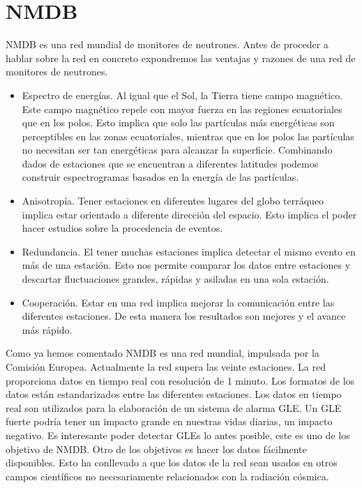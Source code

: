 \section{NMDB}
	NMDB\cite{NMDB2011} es una red mundial de monitores de neutrones. Antes de proceder a hablar sobre la red en concreto expondremos las ventajas
	y razones de una red de monitores de neutrones.
	\begin{itemize}
		\item 	Espectro de energías. Al igual que el Sol, la Tierra tiene campo magnético. Este campo magnético repele con mayor fuerza en
		  	las regiones ecuatoriales que en los polos. Esto implica que solo las partículas más energéticas son perceptibles en las
			zonas ecuatoriales, mientras que en los polos las partículas no necesitan ser tan energéticas para alcanzar la superficie.
			Combinando dados de estaciones que se encuentran a diferentes latitudes podemos construir espectrogramas basados en la energía
			de las partículas.
		\item 	Anisotropía. Tener estaciones en diferentes lugares del globo terráqueo implica estar orientado a diferente dirección del
		  	espacio. Esto implica el poder hacer estudios sobre la procedencia de eventos.
		\item 	Redundancia. El tener muchas estaciones implica detectar el mismo evento en más de una estación. Esto nos permite comparar
		  	los datos entre estaciones y descartar fluctuaciones grandes, rápidas y asiladas en una sola estación.
		\item 	Cooperación. Estar en una red implica mejorar la comunicación entre las diferentes estaciones. De esta manera los resultados
		  	son mejores y el avance más rápido. 
	\end{itemize}
	Como ya hemos comentado NMDB es una red mundial, impulsada por la Comisión Europea. Actualmente la red supera las veinte estaciones. La red 
	proporciona datos en tiempo real con resolución de 1 minuto. Los formatos de los datos están estandarizados entre las diferentes estaciones.
	Los datos en tiempo real son utilizados para la elaboración de un sistema de alarma GLE\cite{GleAlarm}. Un GLE fuerte podría tener un impacto grande en
	nuestras vidas diarias, un impacto negativo. Es interesante poder detectar GLEs lo antes posible, este es uno de los objetivo de NMDB.
	Otro de los objetivos es hacer los datos fácilmente disponibles. Esto ha conllevado a que los datos de la red sean usados en otros campos 
	científicos no necesariamente relacionados con la radiación cósmica. 

